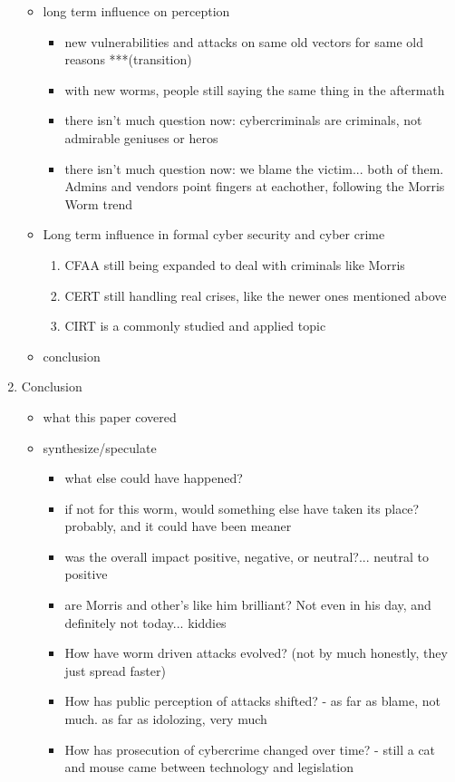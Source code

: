 \begin{enumerate}
\begin{itemize}
\begin{itemize}
		\end{itemize}
	\item long term influence on perception
    	\begin{itemize}
        \item new vulnerabilities and attacks on same old vectors for same old reasons ***(transition)
    	\item with new worms, people still saying the same thing in the aftermath
    	\item there isn't much question now: cybercriminals are criminals, not admirable geniuses or heros
    	\item there isn't much question now: we blame the victim... both of them. 
              Admins and vendors point fingers at eachother, following the Morris Worm trend
    	\end{itemize}
	\item Long term influence in formal cyber security and cyber crime
    	\begin{enumerate}
        \item CFAA still being expanded to deal with criminals like Morris
        \item CERT still handling real crises, like the newer ones mentioned above
        \item CIRT is a commonly studied and applied topic
    	\end{enumerate}
    \item conclusion
	\end{itemize}
\item Conclusion
	\begin{itemize}
	\item what this paper covered
	\item synthesize/speculate
   		\begin{itemize}
   		\item what else could have happened?
        \item if not for this worm, would something else have taken its place? probably, and it could have been meaner
        \item was the overall impact positive, negative, or neutral?... neutral to positive
        \item are Morris and other's like him brilliant? Not even in his day, and definitely not today... kiddies
        \item How have worm driven attacks evolved? (not by much honestly, they just spread faster)
        \item How has public perception of attacks shifted? - as far as blame, not much. as far as idolozing, very much
        \item How has prosecution of cybercrime changed over time? - still a cat and mouse came between technology and legislation
   		\end{itemize} 
	\end{itemize}
\end{enumerate}


